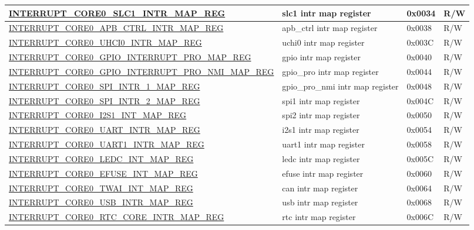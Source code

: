 \begin{longtable}{ | p{6cm} | p{7.2cm} | p{1.3cm} | p{1cm} | }
\hyperref[regdesc:INTERRUPTCORE0SLC1INTRMAPREG]{INTERRUPT\_CORE0\_SLC1\_INTR\_MAP\_REG} & slc1 intr map register & 0x0034 & R/W \\ \hline
\hyperref[regdesc:INTERRUPTCORE0APBCTRLINTRMAPREG]{INTERRUPT\_CORE0\_APB\_CTRL\_INTR\_MAP\_REG} & apb\_ctrl intr map register & 0x0038 & R/W \\ \hline
\hyperref[regdesc:INTERRUPTCORE0UHCI0INTRMAPREG]{INTERRUPT\_CORE0\_UHCI0\_INTR\_MAP\_REG} & uchi0 intr map register & 0x003C & R/W \\ \hline
\hyperref[regdesc:INTERRUPTCORE0GPIOINTERRUPTPROMAPREG]{INTERRUPT\_CORE0\_GPIO\_INTERRUPT\_PRO\_MAP\_REG} & gpio intr map register & 0x0040 & R/W \\ \hline
\hyperref[regdesc:INTERRUPTCORE0GPIOINTERRUPTPRONMIMAPREG]{INTERRUPT\_CORE0\_GPIO\_INTERRUPT\_PRO\_NMI\_MAP\_REG} & gpio\_pro intr map register & 0x0044 & R/W \\ \hline
\hyperref[regdesc:INTERRUPTCORE0SPIINTR1MAPREG]{INTERRUPT\_CORE0\_SPI\_INTR\_1\_MAP\_REG} & gpio\_pro\_nmi intr map register & 0x0048 & R/W \\ \hline
\hyperref[regdesc:INTERRUPTCORE0SPIINTR2MAPREG]{INTERRUPT\_CORE0\_SPI\_INTR\_2\_MAP\_REG} & spi1 intr map register & 0x004C & R/W \\ \hline
\hyperref[regdesc:INTERRUPTCORE0I2S1INTMAPREG]{INTERRUPT\_CORE0\_I2S1\_INT\_MAP\_REG} & spi2 intr map register & 0x0050 & R/W \\ \hline
\hyperref[regdesc:INTERRUPTCORE0UARTINTRMAPREG]{INTERRUPT\_CORE0\_UART\_INTR\_MAP\_REG} & i2s1 intr map register & 0x0054 & R/W \\ \hline
\hyperref[regdesc:INTERRUPTCORE0UART1INTRMAPREG]{INTERRUPT\_CORE0\_UART1\_INTR\_MAP\_REG} & uart1 intr map register & 0x0058 & R/W \\ \hline
\hyperref[regdesc:INTERRUPTCORE0LEDCINTMAPREG]{INTERRUPT\_CORE0\_LEDC\_INT\_MAP\_REG} & ledc intr map register & 0x005C & R/W \\ \hline
\hyperref[regdesc:INTERRUPTCORE0EFUSEINTMAPREG]{INTERRUPT\_CORE0\_EFUSE\_INT\_MAP\_REG} & efuse intr map register & 0x0060 & R/W \\ \hline
\hyperref[regdesc:INTERRUPTCORE0TWAIINTMAPREG]{INTERRUPT\_CORE0\_TWAI\_INT\_MAP\_REG} & can intr map register & 0x0064 & R/W \\ \hline
\hyperref[regdesc:INTERRUPTCORE0USBINTRMAPREG]{INTERRUPT\_CORE0\_USB\_INTR\_MAP\_REG} & usb intr map register & 0x0068 & R/W \\ \hline
\hyperref[regdesc:INTERRUPTCORE0RTCCOREINTRMAPREG]{INTERRUPT\_CORE0\_RTC\_CORE\_INTR\_MAP\_REG} & rtc intr map register & 0x006C & R/W \\ \hline

\end{longtable}
